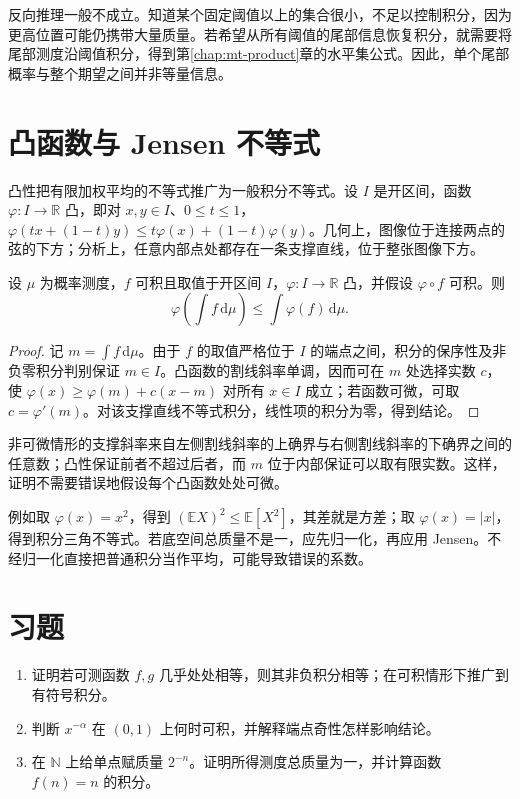 反向推理一般不成立。知道某个固定阈值以上的集合很小，不足以控制积分，因为更高位置可能仍携带大量质量。若希望从所有阈值的尾部信息恢复积分，就需要将尾部测度沿阈值积分，得到第\ref{chap:mt-product}章的水平集公式。因此，单个尾部概率与整个期望之间并非等量信息。

\section{凸函数与 Jensen 不等式}
凸性把有限加权平均的不等式推广为一般积分不等式。设 $I$ 是开区间，函数 $\varphi:I\to\mathbb R$ 凸，即对 $x,y\in I$、$0\leq t\leq1$，
$\varphi(tx+(1-t)y)\leq t\varphi(x)+(1-t)\varphi(y)$。几何上，图像位于连接两点的弦的下方；分析上，任意内部点处都存在一条支撑直线，位于整张图像下方。

\begin{theorem}
设 $\mu$ 为概率测度，$f$ 可积且取值于开区间 $I$，$\varphi:I\to\mathbb R$ 凸，并假设 $\varphi\circ f$ 可积。则
\[
 \varphi\!\left(\int f\,\mathrm d\mu\right)
 \leq\int\varphi(f)\,\mathrm d\mu.
\]
\label{thm:mt-jensen}
\end{theorem}
\begin{proof}
记 $m=\int f\,\mathrm d\mu$。由于 $f$ 的取值严格位于 $I$ 的端点之间，积分的保序性及非负零积分判别保证 $m\in I$。凸函数的割线斜率单调，因而可在 $m$ 处选择实数 $c$，使
$\varphi(x)\geq\varphi(m)+c(x-m)$ 对所有 $x\in I$ 成立；若函数可微，可取 $c=\varphi'(m)$。对该支撑直线不等式积分，线性项的积分为零，得到结论。
\end{proof}
非可微情形的支撑斜率来自左侧割线斜率的上确界与右侧割线斜率的下确界之间的任意数；凸性保证前者不超过后者，而 $m$ 位于内部保证可以取有限实数。这样，证明不需要错误地假设每个凸函数处处可微。

例如取 $\varphi(x)=x^2$，得到 $(\mathbb E X)^2\leq\mathbb E[X^2]$，其差就是方差；取 $\varphi(x)=|x|$，得到积分三角不等式。若底空间总质量不是一，应先归一化，再应用 Jensen。不经归一化直接把普通积分当作平均，可能导致错误的系数。

\section{习题}
\begin{enumerate}
 \item 证明若可测函数 $f,g$ 几乎处处相等，则其非负积分相等；在可积情形下推广到有符号积分。
 \item 判断 $x^{-\alpha}$ 在 $(0,1)$ 上何时可积，并解释端点奇性怎样影响结论。
 \item 在 $\mathbb N$ 上给单点赋质量 $2^{-n}$。证明所得测度总质量为一，并计算函数 $f(n)=n$ 的积分。
\end{enumerate}

